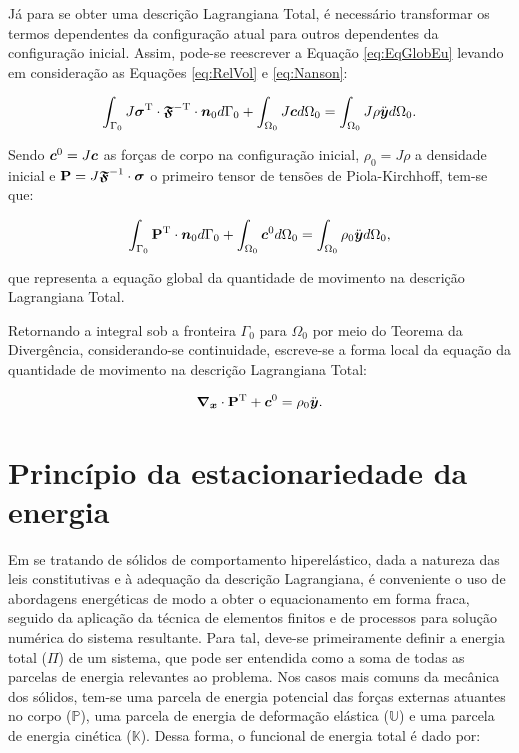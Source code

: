 Já para se obter uma descrição Lagrangiana Total, é necessário transformar os termos dependentes da configuração atual para outros dependentes da configuração inicial. Assim, pode-se reescrever a Equação \eqref{eq:EqGlobEu} levando em consideração as Equações \eqref{eq:RelVol} e \eqref{eq:Nanson}:

\begin{equation}
    \int_{\Gamma_0}{J\boldsymbol{\sigma}^\mathrm{T}\cdot\boldsymbol{\mathfrak{F}}^\mathrm{-T}\cdot\boldsymbol{n}_0d\Gamma_0}+\int_{\Omega_0}{J\boldsymbol{c}d\Omega_0}=\int_{\Omega_0}{J\rho\ddot{\boldsymbol{y}}d\Omega_0}
    \text{.}
\end{equation}

\noindent Sendo $\boldsymbol{c}^0=J\boldsymbol{c}$ as forças de corpo na configuração inicial, $\rho_0=J\rho$ a densidade inicial e $\mathbf{P}=J\boldsymbol{\mathfrak{F}}^{-1}\cdot\boldsymbol{\sigma}$ o primeiro tensor de tensões de Piola-Kirchhoff, tem-se que:

\begin{equation}
    \int_{\Gamma_0}{\mathbf{P}^\mathrm{T}\cdot\boldsymbol{n}_0d\Gamma_0}+\int_{\Omega_0}{\boldsymbol{c}^0d\Omega_0}=\int_{\Omega_0}{\rho_0\ddot{\boldsymbol{y}}d\Omega_0}\text{,}
\end{equation}

\noindent que representa a equação global da quantidade de movimento na descrição Lagrangiana Total.

Retornando a integral sob a fronteira $\Gamma_0$ para $\Omega_0$ por meio do Teorema da Divergência, considerando-se continuidade, escreve-se a forma local da equação da quantidade de movimento na descrição Lagrangiana Total:

\begin{equation}
    \boldsymbol{\nabla_x}\cdot\mathbf{P}^\mathrm{T}+\boldsymbol{c}^0=\rho_0\ddot{\boldsymbol{y}}\text{.}\label{eq:EqLocLa}
\end{equation}

\section{Princípio da estacionariedade da energia} \label{PrincEstacEnergia}

Em se tratando de sólidos de comportamento hiperelástico, dada a natureza das leis constitutivas e à adequação da descrição Lagrangiana, é conveniente o uso de abordagens energéticas de modo a obter o equacionamento em forma fraca, seguido da aplicação da técnica de elementos finitos e de processos para solução numérica do sistema resultante. Para tal, deve-se primeiramente definir a energia total ($\Pi$) de um sistema, que pode ser entendida como a soma de todas as parcelas de energia relevantes ao problema. Nos casos mais comuns da mecânica dos sólidos, tem-se uma parcela de energia potencial das forças externas atuantes no corpo ($\mathbb{P}$), uma parcela de energia de deformação elástica ($\mathbb{U}$) e uma parcela de energia cinética ($\mathbb{K}$). Dessa forma, o funcional de energia total é dado por:

